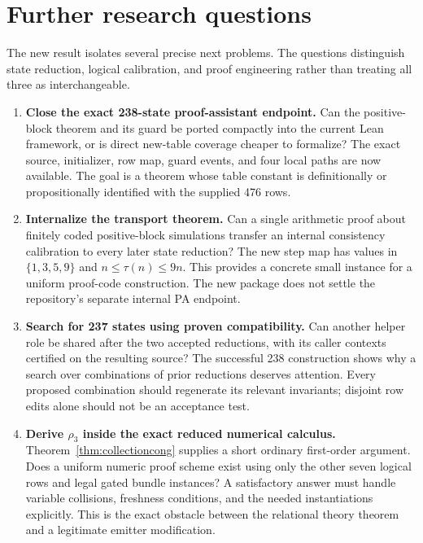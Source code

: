 \section{Further research questions}
\label{sec:further}

The new result isolates several precise next problems.
The questions distinguish state reduction, logical
calibration, and proof engineering rather than treating
all three as interchangeable.

\begin{enumerate}[label=\textbf{Q\arabic*.},leftmargin=2.8em]
\item \textbf{Close the exact 238-state proof-assistant endpoint.}
Can the positive-block theorem and its guard be ported
compactly into the current Lean framework, or is direct
new-table coverage cheaper to formalize? The exact
source, initializer, row map, guard events, and four
local paths are now available. The goal is a theorem
whose table constant is definitionally or propositionally
identified with the supplied 476 rows.

\item \textbf{Internalize the transport theorem.}
Can a single arithmetic proof about finitely coded
positive-block simulations transfer an internal
consistency calibration to every later state reduction?
The new step map has values in $\{1,3,5,9\}$ and
$n\le\tau(n)\le9n$. This provides a concrete small
instance for a uniform proof-code construction.
The new package does not settle the repository's
separate internal PA endpoint.

\item \textbf{Search for 237 states using proven compatibility.}
Can another helper role be shared after the two
accepted reductions, with its caller contexts
certified on the resulting source? The successful
238 construction shows why a search over combinations
of prior reductions deserves attention. Every proposed
combination should regenerate its relevant invariants;
disjoint row edits alone should not be an acceptance
test.

\item \textbf{Derive $\rho_3$ inside the exact reduced numerical calculus.}
Theorem~\ref{thm:collectioncong} supplies a short
ordinary first-order argument. Does a uniform numeric
proof scheme exist using only the other seven logical
rows and legal gated bundle instances? A satisfactory
answer must handle variable collisions, freshness
conditions, and the needed instantiations explicitly.
This is the exact obstacle between the relational
theory theorem and a legitimate emitter modification.


\end{enumerate}
